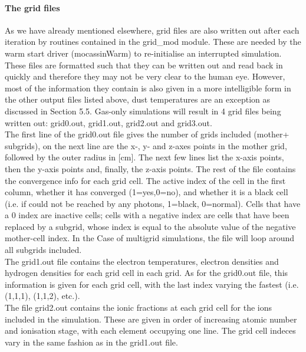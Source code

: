 \documentclass[11pt]{article}
\begin{document}
\paragraph{    The grid files}
    As we have already mentioned elsewhere, grid files are also written out 
    after each iteration by routines contained in the grid\_mod module. These are 
    needed by the warm start driver (mocassinWarm) to re-initialise an 
    interrupted simulation. These files are 
    formatted such that they can be written out and read back in quickly and 
    therefore they may not be very clear to the human eye. However,  most of the 
    information they contain is also given in a more intelligible form in the other
    output files listed above, dust temperatures are an exception as discussed 
    in Section 5.5. Gas-only simulations will result in 4 grid files being written out:
    grid0.out, grid1.out, grid2.out and grid3.out. \\
        The first line of the grid0.out file gives the number of grids included (mother+
   subgrids), on the next line are the x-, y- and z-axes points in the mother grid, 
   followed by the outer radius in [cm]. 
   The next few lines list the x-axis points, then the y-axis points and, 
   finally, the z-axis points. The rest of the file contains the convergence info 
    for each grid cell. The active index of the cell in the first column, whether it 
    has converged (1=yes,0=no), and whether it is a black cell (i.e. if could not 
    be reached by any photons, 1=black, 0=normal). Cells that have a 0 index are 
    inactive cells; cells with a negative index are cells that have been replaced 
    by a subgrid, whose index is equal to the absolute value of the negative 
    mother-cell index. 
    In the Case of multigrid simulations, the file will loop around all subgrids
    included.\\
    The grid1.out file contains the electron temperatures,
    electron densities and hydrogen densities for each grid cell in each grid. 
    As for the grid0.out file, this information
    is given for each grid cell, with the last index varying the fastest 
    (i.e. (1,1,1), (1,1,2), etc.). \\
    The file grid2.out contains the ionic fractions
    at each grid cell for the ions included in the simulation. These are given in 
    order of increasing atomic number and ionisation stage, with each element 
    occupying one line. The grid cell indeces vary in the same fashion as in the 
    grid1.out file. \\
\end{document}
